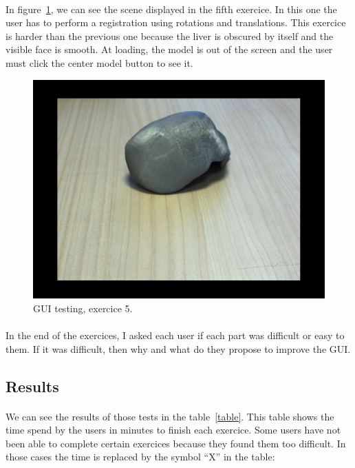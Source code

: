 \documentclass[12pt]{report}
\begin{document}
\paragraph{}
	In figure~\ref{exercice5}, we can see the scene displayed in the fifth exercice. In this one the user has to perform a registration using rotations and translations. This exercice is harder than the previous one because the liver is obscured by itself and the visible face is smooth. At loading, the model is out of the screen and the user must click the center model button to see it.

\vspace{10pt}
\begin{figure}[H]
\centerline{\includegraphics[scale = 0.3]{img/exercice5.png}}
\caption{GUI testing, exercice 5.}
\label{exercice5}
\end{figure}

\paragraph{}
In the end of the exercices, I asked each user if each part was difficult or easy to them. If it was difficult, then why and what do they propose to improve the GUI.


\subsection{Results}
\paragraph{}
We can see the results of those tests in the table~\ref{table}. This table shows the time spend by the users in minutes to finish each exercice. Some users have not been able to complete certain exercices because they found them too difficult. In those cases the time is replaced by the symbol ``X'' in the table:
\end{document}
